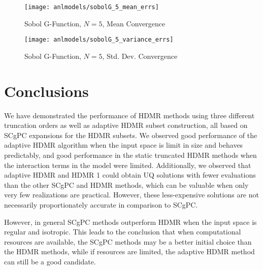 \begin{figure}[H]
  \centering
  \texttt{[image: anlmodels/sobolG\_5\_mean\_errs]}
  \caption{Sobol G-Function, $N=5$, Mean Convergence}
  \label{fig:hdmr sobolG mean errors 5}
\end{figure}
\begin{figure}[H]
  \centering
  \texttt{[image: anlmodels/sobolG\_5\_variance\_errs]}
  \caption{Sobol G-Function, $N=5$, Std. Dev. Convergence}
  \label{fig:hdmr sobolG var errors 5}
\end{figure}


\section{Conclusions}
We have demonstrated the performance of HDMR methods using three different truncation orders as well as
adaptive HDMR subset construction, all based on SCgPC expansions for the HDMR subsets.  We observed good
performance of the adaptive HDMR algorithm when the input space is limit in size and behaves predictably, and
good performance in the static truncated HDMR methods when the interaction terms in the model were limited.
Additionally, we observed that adaptive HDMR and HDMR 1 could obtain UQ solutions with fewer evaluations than
the other SCgPC and HDMR methods, which can be valuable when only very few realizations are practical.
However, these less-expensive solutions are not necessarily proportionately accurate in comparison to SCgPC.

However, in general SCgPC methods outperform HDMR when the input space is regular and isotropic.  This leads
to the conclusion that when computational resources are available, the SCgPC methods may be a better initial choice
than the HDMR methods, while if resources are limited, the adaptive HDMR method can still be a good candidate.
